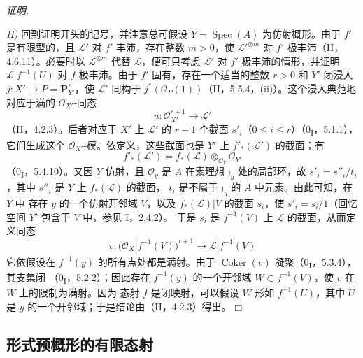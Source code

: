 \documentclass[UTF8,fontset=none,11pt,oneside,openany]{ctexbook}
\providecommand{\square}{\mdlgwhtsquare}
\newenvironment{proof}{%
  \par\smallskip\noindent\textit{证明.}\ %
}{\hfill$\square$\par}
\newcommand{\oldpage}[2][]{%
  \hypertarget{ega-source-page-#1-#2}{}%
  \marginnote{\scriptsize\textbf{#1}~|~#2}\ignorespaces}
\begin{document}
\begin{proof}
\oldpage[III]{146}

\noindent\textit{II)} 回到证明开头的记号，并注意总可假设
$Y=\operatorname{Spec}(A)$ 为仿射概形。由于 $f'$ 是有限型的，且
$\mathcal L'$ 对 $f'$ 丰沛，存在整数 $m>0$，使
$\mathcal L'^{\otimes m}$ 对 $f'$ 极丰沛（II，4.6.11）。必要时以
$\mathcal L^{\otimes m}$ 代替 $\mathcal L$，便可只考虑 $\mathcal L'$ 对
$f'$ 极丰沛的情形，并证明 $\mathcal L|f^{-1}(U)$ 对 $f$ 极丰沛。由于
$f'$ 固有，存在一个适当的整数 $r>0$ 和 $Y'$-闭浸入
$j:X'\to P=\mathbf P_{Y'}^r$，使 $\mathcal L'$ 同构于
$j^*(\mathcal O_P(1))$（II，5.5.4，(ii)）。这个浸入典范地对应于满的
$\mathcal O_{X'}$-同态
\[
u:\mathcal O_{X'}^{r+1}\longrightarrow\mathcal L'
\]
（II，4.2.3）。后者对应于 $X'$ 上 $\mathcal L'$ 的 $r+1$ 个截面
$s'_i$（$0\leq i\leq r$）（0\textsubscript{I}，5.1.1），它们生成这个
$\mathcal O_{X'}$-模。依定义，这些截面也是 $Y'$ 上
$f'_*(\mathcal L')$ 的截面；有
\[
f'_*(\mathcal L')=f_*(\mathcal L)\otimes_{\mathcal O_Y}\mathcal O_{Y'}
\]
（0\textsubscript{I}，5.4.10）。又因 $Y$ 仿射，且 $\mathcal O_y$ 是
$A$ 在素理想 $\mathfrak j_y$ 处的局部环，故
$s'_i=s''_i/t_i$，其中 $s''_i$ 是 $Y$ 上 $f_*(\mathcal L)$ 的截面，
$t_i$ 是不属于 $\mathfrak j_y$ 的 $A$ 中元素。由此可知，在 $Y$ 中
存在 $y$ 的一个仿射开邻域 $V$，以及 $f_*(\mathcal L)|V$ 的截面
$s_i$，使 $s'_i=s_i/1$（回忆空间 $Y'$ 包含于 $V$ 中，参见 I，2.4.2）。
于是 $s_i$ 是 $f^{-1}(V)$ 上 $\mathcal L$ 的截面，从而定义同态
\[
v:\bigl(\mathcal O_X|f^{-1}(V)\bigr)^{r+1}
\longrightarrow\mathcal L|f^{-1}(V)
\]
它依假设在 $f^{-1}(y)$ 的所有点处都是满射。由于
$\operatorname{Coker}(v)$ 凝聚（0\textsubscript{I}，5.3.4），其支集闭
（0\textsubscript{I}，5.2.2）；因此存在 $f^{-1}(y)$ 的一个开邻域
$W\subset f^{-1}(V)$，使 $v$ 在 $W$ 上的限制为满射。因为
态射 $f$ 是闭映射，可以假设 $W$ 形如 $f^{-1}(U)$，其中 $U$ 是
$y$ 的一个开邻域；于是结论由（II，4.2.3）得出。
\end{proof}

\subsection{形式预概形的有限态射}
\end{document}
